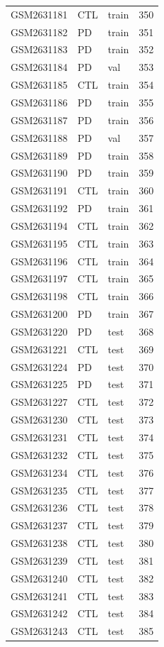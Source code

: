\begin{footnotesize}
\begin{longtable}{llll}
GSM2631181 & CTL & train & 350 \\
GSM2631182 & PD & train & 351 \\
GSM2631183 & PD & train & 352 \\
GSM2631184 & PD & val & 353 \\
GSM2631185 & CTL & train & 354 \\
GSM2631186 & PD & train & 355 \\
GSM2631187 & PD & train & 356 \\
GSM2631188 & PD & val & 357 \\
GSM2631189 & PD & train & 358 \\
GSM2631190 & PD & train & 359 \\
GSM2631191 & CTL & train & 360 \\
GSM2631192 & PD & train & 361 \\
GSM2631194 & CTL & train & 362 \\
GSM2631195 & CTL & train & 363 \\
GSM2631196 & CTL & train & 364 \\
GSM2631197 & CTL & train & 365 \\
GSM2631198 & CTL & train & 366 \\
GSM2631200 & PD & train & 367 \\
GSM2631220 & PD & test & 368 \\
GSM2631221 & CTL & test & 369 \\
GSM2631224 & PD & test & 370 \\
GSM2631225 & PD & test & 371 \\
GSM2631227 & CTL & test & 372 \\
GSM2631230 & CTL & test & 373 \\
GSM2631231 & CTL & test & 374 \\
GSM2631232 & CTL & test & 375 \\
GSM2631234 & CTL & test & 376 \\
GSM2631235 & CTL & test & 377 \\
GSM2631236 & CTL & test & 378 \\
GSM2631237 & CTL & test & 379 \\
GSM2631238 & CTL & test & 380 \\
GSM2631239 & CTL & test & 381 \\
GSM2631240 & CTL & test & 382 \\
GSM2631241 & CTL & test & 383 \\
GSM2631242 & CTL & test & 384 \\
GSM2631243 & CTL & test & 385 \\

\end{longtable}
\end{footnotesize}
